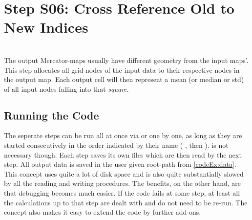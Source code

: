 \section{Step S06: Cross Reference Old to New Indices} \label{S:06}
\\
The output Mercator-maps usually have different geometry from the input maps'.
This step allocates all grid nodes of the input data
to their respective nodes in the output map. Each output cell will then represent a mean (or median or std) of all input-nodes falling into that \textit{square}.



\subsection{Running the Code}
The seperate steps can be run all at once via  or one by one, as
long as they are started consecutively in the order indicated by their name
( , then  \etc).  is not necessary
though. Each step saves its own files which are then read by the next step.
All output data is saved in the user given root-path from \ref{codeEx:data}.
This concept uses quite a lot of disk space and is also quite substantially
slowed by all the reading and writing procedures. The benefits, on the other
hand, are that debugging becomes much easier. If the code fails at some step,
at least all the calculations up to that step are dealt with and do not need to
be re-run. The concept also makes it easy to extend the code by further
add-ons.












